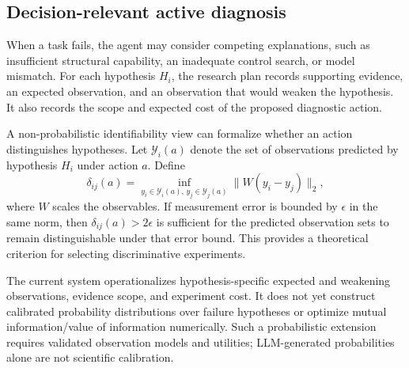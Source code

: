 \subsection{Decision-relevant active diagnosis}

When a task fails, the agent may consider competing explanations, such as insufficient structural capability, an inadequate control search, or model mismatch. For each hypothesis $H_i$, the research plan records supporting evidence, an expected observation, and an observation that would weaken the hypothesis. It also records the scope and expected cost of the proposed diagnostic action.

A non-probabilistic identifiability view can formalize whether an action distinguishes hypotheses. Let $\mathcal Y_i(a)$ denote the set of observations predicted by hypothesis $H_i$ under action $a$. Define
\begin{equation}
\delta_{ij}(a)=
\inf_{y_i\in\mathcal Y_i(a),\,y_j\in\mathcal Y_j(a)}
\|W(y_i-y_j)\|_2,
\label{eq:separation}
\end{equation}
where $W$ scales the observables. If measurement error is bounded by $\epsilon$ in the same norm, then $\delta_{ij}(a)>2\epsilon$ is sufficient for the predicted observation sets to remain distinguishable under that error bound. This provides a theoretical criterion for selecting discriminative experiments.

The current system operationalizes hypothesis-specific expected and weakening observations, evidence scope, and experiment cost. It does not yet construct calibrated probability distributions over failure hypotheses or optimize mutual information/value of information numerically. Such a probabilistic extension requires validated observation models and utilities; LLM-generated probabilities alone are not scientific calibration.
